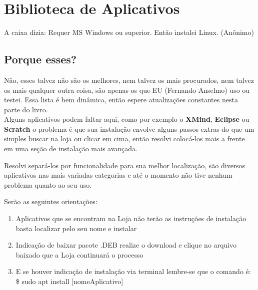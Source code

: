 % 
% 
\chapter{Biblioteca de Aplicativos}

\begin{remark}
A caixa dizia: Requer MS Windows ou superior. Então instalei Linux. (Anônimo) 
\end{remark}

\section{Porque esses?}
Não, esses talvez não são os melhores, nem talvez os mais procurados, nem talvez os mais qualquer outra coisa, são apenas os que EU (Fernando Anselmo) uso ou testei. Essa lista é bem dinâmica, então espere atualizações constantes nesta parte do livro. \\[3mm]
Alguns aplicativos podem faltar aqui, como por exemplo o \textbf{XMind}, \textbf{Eclipse} ou \textbf{Scratch} o problema é que sua instalação envolve alguns passos extras do que um simples buscar na loja ou clicar em cima, então resolvi colocá-los mais a frente em uma seção de instalação mais avançada.

Resolvi separá-los por funcionalidade para sua melhor localização, são diversos aplicativos nas mais variadas categorias e até o momento não tive nenhum problema quanto ao seu uso. \\[3mm]
\begin{dica} Serão as seguintes orientações:
 \begin{enumerate} [noitemsep]
  \item Aplicativos que se encontram na Loja não terão as instruções de instalação basta localizar pelo seu nome e instalar
  \item Indicação de baixar pacote .DEB realize o download e clique no arquivo baixado que a Loja continuará o processo
  \item E se houver indicação de instalação via terminal lembre-se que o comando é: \\
  {\ttfamily\$ sudo apt install [nomeAplicativo]}
 \end{enumerate}
\end{dica}


